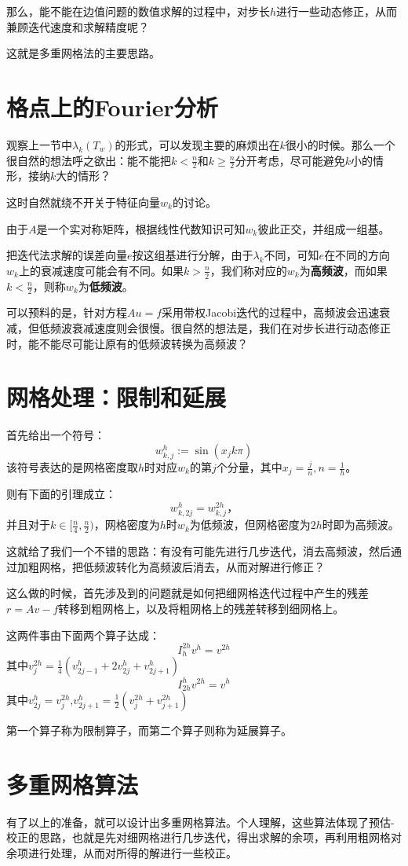 \documentclass[UTF8]{ctexart}
\theoremstyle{plain}
\theoremstyle{definition}
\theoremstyle{remark}
\begin{document}
那么，能不能在边值问题的数值求解的过程中，对步长$h$进行一些动态修正，从而兼顾迭代速度和求解精度呢？

这就是多重网格法的主要思路。
\section{格点上的Fourier分析}
观察上一节中$\lambda_{k}(T_{w})$的形式，可以发现主要的麻烦出在$k$很小的时候。那么一个很自然的想法呼之欲出：能不能把$k<\frac{n}{2}$和$k\ge\frac{n}{2}$分开考虑，尽可能避免$k$小的情形，接纳$k$大的情形？

这时自然就绕不开关于特征向量$w_{k}$的讨论。

由于$A$是一个实对称矩阵，根据线性代数知识可知$w_{k}$彼此正交，并组成一组基。

把迭代法求解的误差向量$e$按这组基进行分解，由于$\lambda_{k}$不同，可知$e$在不同的方向$w_{k}$上的衰减速度可能会有不同。如果$k>\frac{n}{2}$，我们称对应的$w_{k}$为\textbf{高频波}，而如果$k<\frac{n}{2}$，则称$w_{k}$为\textbf{低频波}。

可以预料的是，针对方程$Au=f$采用带权Jacobi迭代的过程中，高频波会迅速衰减，但低频波衰减速度则会很慢。很自然的想法是，我们在对步长进行动态修正时，能不能尽可能让原有的低频波转换为高频波？
\section{网格处理：限制和延展}
首先给出一个符号：
$$
w_{k,j}^{h}:=\sin(x_{j}k\pi)
$$
该符号表达的是网格密度取$h$时对应$w_{k}$的第$j$个分量，其中$x_{j}=\frac{j}{n},n=\frac{1}{h}$。

则有下面的引理成立：
$$
w_{k,2j}^{h}=w_{k,j}^{2h}，
$$
并且对于$k\in[\frac{n}{4},\frac{n}{2})$，网格密度为$h$时$w_{k}$为低频波，但网格密度为$2h$时即为高频波。

这就给了我们一个不错的思路：有没有可能先进行几步迭代，消去高频波，然后通过加粗网格，把低频波转化为高频波后消去，从而对解进行修正？

这么做的时候，首先涉及到的问题就是如何把细网格迭代过程中产生的残差$r=Av-f$转移到粗网格上，以及将粗网格上的残差转移到细网格上。

这两件事由下面两个算子达成：
$$
I_{h}^{2h}v^{h}=v^{2h}
$$
其中$v_{j}^{2h}=\frac{1}{4}(v_{2j-1}^{h}+2v_{2j}^{h}+v_{2j+1}^{h})$
$$
I_{2h}^{h}v^{2h}=v^{h}
$$
其中$v_{2j}^{h}=v_{j}^{2h}$,$v_{2j+1}^{h}=\frac{1}{2}(v_{j}^{2h}+v_{j+1}^{2h})$

第一个算子称为限制算子，而第二个算子则称为延展算子。
\section{多重网格算法}
有了以上的准备，就可以设计出多重网格算法。个人理解，这些算法体现了预估-校正的思路，也就是先对细网格进行几步迭代，得出求解的余项，再利用粗网格对余项进行处理，从而对所得的解进行一些校正。
\end{document}
